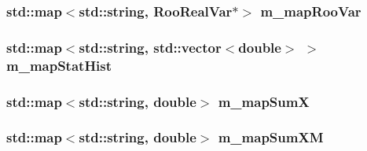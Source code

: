 \hypertarget{classBiasAnalysis_a97398da96a4afaf1b4b69a8bd834f555}{
\subsubsection[{m\+\_\+map\+Roo\+Var}]{\setlength{\rightskip}{0pt plus 5cm}std\+::map$<$std\+::string, Roo\+Real\+Var$\ast$$>$ m\+\_\+map\+Roo\+Var\hspace{0.3cm}{\ttfamily [private]}}}\label{classBiasAnalysis_a97398da96a4afaf1b4b69a8bd834f555}
\hypertarget{classBiasAnalysis_a4012de0928fa751a15e9a6fecd2249ec}{
\subsubsection[{m\+\_\+map\+Stat\+Hist}]{\setlength{\rightskip}{0pt plus 5cm}std\+::map$<$std\+::string, std\+::vector$<$double$>$ $>$ m\+\_\+map\+Stat\+Hist\hspace{0.3cm}{\ttfamily [private]}}}\label{classBiasAnalysis_a4012de0928fa751a15e9a6fecd2249ec}
\hypertarget{classBiasAnalysis_a01057845bb932055dd6a9607175b29a6}{
\subsubsection[{m\+\_\+map\+Sum\+X}]{\setlength{\rightskip}{0pt plus 5cm}std\+::map$<$std\+::string, double$>$ m\+\_\+map\+Sum\+X\hspace{0.3cm}{\ttfamily [private]}}}\label{classBiasAnalysis_a01057845bb932055dd6a9607175b29a6}
\hypertarget{classBiasAnalysis_a37e8fb534be7789893a6d3fe269fad10}{
\subsubsection[{m\+\_\+map\+Sum\+X\+M}]{\setlength{\rightskip}{0pt plus 5cm}std\+::map$<$std\+::string, double$>$ m\+\_\+map\+Sum\+X\+M\hspace{0.3cm}{\ttfamily [private]}}}\label{classBiasAnalysis_a37e8fb534be7789893a6d3fe269fad10}
